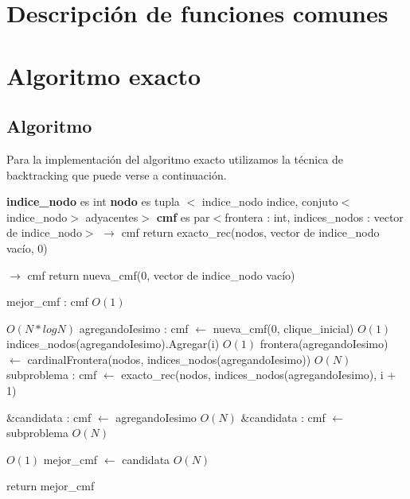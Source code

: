 \documentclass[a4paper, 10pt, twoside]{article}
\newenvironment{pseudo}[1][]{%
    \vspace{1em}%
    \begin{algorithmic}%
}
{%
    \end{algorithmic}%
    \vspace{1em}%
}
\newcommand{\Ode}[1]{\hfill $O(#1)$}
\begin{document}
\section{Descripción de funciones comunes}




\newpage

\section{Algoritmo exacto}
\subsection{Algoritmo}
Para la implementación del algoritmo exacto utilizamos la técnica de backtracking que puede verse a continuación.

\begin{pseudo}
\State \textbf{indice\_nodo} es int
\State \textbf{nodo} es tupla $<$ indice\_nodo indice, conjuto$<$indice\_nodo$>$ adyacentes$>$
\State \textbf{cmf} es par$<$frontera : int, indices\_nodos : vector de indice\_nodo$>$
\State
{} $\rightarrow$ cmf
	\State return exacto\_rec(nodos, vector de indice\_nodo vacío, 0)
\State
\EndProcedure

 $\rightarrow$ cmf
	 return nueva\_cmf(0, vector de indice\_nodo vacío) \EndIf

	\State mejor\_cmf : cmf									\Ode{1}

		 \Ode{N * log N}
			\State agregandoIesimo : cmf $\leftarrow$ nueva\_cmf(0, clique\_inicial)	\Ode{1}
			\State indices\_nodos(agregandoIesimo).Agregar(i)	\Ode{1}
			\State frontera(agregandoIesimo) $\leftarrow$
					cardinalFrontera(nodos, indices\_nodos(agregandoIesimo))	\Ode{N}
			\State subproblema : cmf $\leftarrow$
					exacto\_rec(nodos, indices\_nodos(agregandoIesimo), i + 1)

				\State \&candidata : cmf $\leftarrow$ agregandoIesimo			\Ode{N}
			\Else 
				\State \&candidata : cmf $\leftarrow$ subproblema				\Ode{N}
			\EndIf

			 \Ode{1}
				\State mejor\_cmf $\leftarrow$ candidata	\Ode{N}
			\EndIf
		\EndIf
	\EndFor

	\State return mejor\_cmf
\EndProcedure
\end{pseudo}
\end{document}
